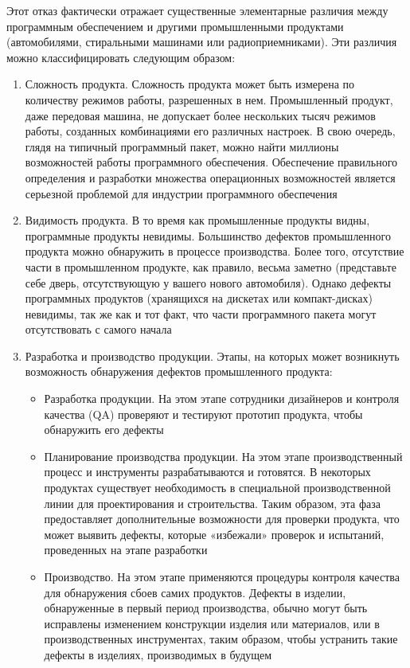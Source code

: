 \documentclass{../industrial-development}
\begin{document}
Этот отказ фактически отражает существенные элементарные различия между программным обеспечением и другими промышленными продуктами (автомобилями, стиральными машинами или радиоприемниками). Эти различия можно классифицировать следующим образом:
 	 \begin{enumerate}
\item Сложность продукта. Сложность продукта может быть измерена по количеству режимов работы, разрешенных в нем. Промышленный продукт, даже передовая машина, не допускает более нескольких тысяч режимов работы, созданных комбинациями его различных настроек. В свою очередь, глядя на типичный программный пакет, можно найти миллионы возможностей работы программного обеспечения. Обеспечение правильного определения и разработки множества операционных возможностей является серьезной проблемой для индустрии программного обеспечения
\item Видимость продукта. В то время как промышленные продукты видны, программные продукты невидимы. Большинство дефектов промышленного продукта можно обнаружить в процессе производства. Более того, отсутствие части в промышленном продукте, как правило, весьма заметно (представьте себе дверь, отсутствующую у вашего нового автомобиля). Однако дефекты программных продуктов (хранящихся на дискетах или компакт-дисках) невидимы, так же как и тот факт, что части программного пакета могут отсутствовать с самого начала
\item Разработка и производство продукции. Этапы, на которых может возникнуть возможность обнаружения дефектов промышленного продукта:
	\begin{itemize}
\item Разработка продукции. На этом этапе сотрудники дизайнеров и контроля качества (QA) проверяют и тестируют прототип продукта, чтобы обнаружить его дефекты
\item Планирование производства продукции. На этом этапе производственный процесс и инструменты разрабатываются и готовятся. В некоторых продуктах существует необходимость в специальной производственной линии для проектирования и строительства. Таким образом, эта фаза предоставляет дополнительные возможности для проверки продукта, что может выявить дефекты, которые «избежали» проверок и испытаний, проведенных на этапе разработки
\item Производство. На этом этапе применяются процедуры контроля качества для обнаружения сбоев самих продуктов. Дефекты в изделии, обнаруженные в первый период производства, обычно могут быть исправлены изменением конструкции изделия или материалов, или в производственных инструментах, таким образом, чтобы устранить такие дефекты в изделиях, производимых в будущем~\cite[с.~4--5]{SQA-Galin}
	\end{itemize}
  	\end{enumerate}
\end{document}

